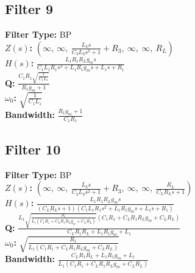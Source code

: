 \documentclass{article}
\begin{document}
\subsection*{Filter 9}
\textbf{Filter Type:} BP \\ 
\textbf{$Z(s)$:} $\left( \infty, \  \infty, \  \frac{L_{3} s}{C_{3} L_{3} s^{2} + 1} + R_{3}, \  \infty, \  \infty, \  R_{L}\right)$ \\ 
\textbf{$H(s)$:} $\frac{L_{1} R_{1} R_{L} g_{m} s}{C_{1} L_{1} R_{1} s^{2} + L_{1} R_{1} g_{m} s + L_{1} s + R_{1}}$ \\ 
\textbf{Q:} $\frac{C_{1} R_{1} \sqrt{\frac{1}{C_{1} L_{1}}}}{R_{1} g_{m} + 1}$ \\ 
\textbf{$\omega_0$:} $\sqrt{\frac{1}{C_{1} L_{1}}}$ \\ 
\textbf{Bandwidth:} $\frac{R_{1} g_{m} + 1}{C_{1} R_{1}}$ \\ 
\subsection*{Filter 10}
\textbf{Filter Type:} BP \\ 
\textbf{$Z(s)$:} $\left( \infty, \  \infty, \  \frac{L_{3} s}{C_{3} L_{3} s^{2} + 1} + R_{3}, \  \infty, \  \infty, \  \frac{R_{L}}{C_{L} R_{L} s + 1}\right)$ \\ 
\textbf{$H(s)$:} $\frac{L_{1} R_{1} R_{L} g_{m} s}{\left(C_{L} R_{L} s + 1\right) \left(C_{1} L_{1} R_{1} s^{2} + L_{1} R_{1} g_{m} s + L_{1} s + R_{1}\right)}$ \\ 
\textbf{Q:} $\frac{L_{1} \sqrt{\frac{R_{1}}{L_{1} \left(C_{1} R_{1} + C_{L} R_{1} R_{L} g_{m} + C_{L} R_{L}\right)}} \left(C_{1} R_{1} + C_{L} R_{1} R_{L} g_{m} + C_{L} R_{L}\right)}{C_{L} R_{1} R_{L} + L_{1} R_{1} g_{m} + L_{1}}$ \\ 
\textbf{$\omega_0$:} $\sqrt{\frac{R_{1}}{L_{1} \left(C_{1} R_{1} + C_{L} R_{1} R_{L} g_{m} + C_{L} R_{L}\right)}}$ \\ 
\textbf{Bandwidth:} $\frac{C_{L} R_{1} R_{L} + L_{1} R_{1} g_{m} + L_{1}}{L_{1} \left(C_{1} R_{1} + C_{L} R_{1} R_{L} g_{m} + C_{L} R_{L}\right)}$ \\ 
\end{document}
